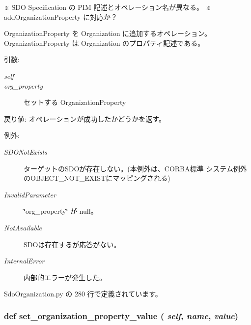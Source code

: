 ※ SDO Specification の PIM 記述とオペレーション名が異なる。 ※ addOrganizationProperty に対応か？\par
 OrganizationProperty を Organization に追加するオペレーション。 OrganizationProperty は Organization のプロパティ記述である。

\begin{Desc}
\item[引数:]
\begin{description}
\item[{\em self}]\item[{\em org\_\-property}]セットする OrganizationProperty\end{description}
\end{Desc}
\begin{Desc}
\item[戻り値:]オペレーションが成功したかどうかを返す。\end{Desc}
\begin{Desc}
\item[例外:]
\begin{description}
\item[{\em SDONotExists}]ターゲットのSDOが存在しない。(本例外は、CORBA標準 システム例外のOBJECT\_\-NOT\_\-EXISTにマッピングされる) \item[{\em InvalidParameter}]\char`\"{}org\_\-property\char`\"{} が null。 \item[{\em NotAvailable}]SDOは存在するが応答がない。 \item[{\em InternalError}]内部的エラーが発生した。 \end{description}
\end{Desc}


 SdoOrganization.py の 280 行で定義されています。
\subsubsection{\setlength{\rightskip}{0pt plus 5cm}def set\_\-organization\_\-property\_\-value ( {\em self},  {\em name},  {\em value})}\label{classsource__py_1_1_sdo_organization_1_1_organization__impl_3c70040412aaaf32581c7cf5bda49160}


